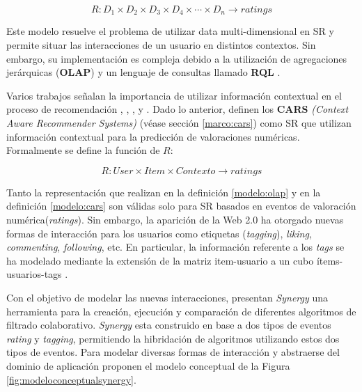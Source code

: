 \begin{equation}
\label{modelo:olap}
	R: D_1 \times D_2 \times D_3 \times D_4 \times \cdots \times D_n \rightarrow ratings
\end{equation}

Este modelo resuelve el problema de utilizar data multi-dimensional en SR y permite situar las interacciones de un usuario en distintos contextos. Sin embargo, su implementación es compleja debido a la utilización de agregaciones jerárquicas (\textbf{OLAP}) y un lenguaje de consultas llamado \textbf{RQL} \citep{Palomino:2012}.

Varios trabajos señalan la importancia de utilizar información contextual en el proceso de recomendación \citep{Adomavicius:2005:2}, \citep{Adomavicius:2001}, \citep{Adomavicius:2011}, \citep{Palomino:2012} y \citep{Zhang:2010}. Dado lo anterior, \cite{Adomavicius:2011} definen  los \textbf{CARS} \textit{(Context Aware Recommender Systems)} (véase sección \ref{marco:cars}) como SR que utilizan información contextual para la predicción de valoraciones numéricas. Formalmente se define la función de $R$:

\begin{equation}
\label{modelo:cars}
	R: User \times Item \times Contexto  \rightarrow ratings
\end{equation}

Tanto la representación que realizan \cite{Adomavicius:2001} en la definición \eqref{modelo:olap} y  \cite{Adomavicius:2011} en la definición \eqref{modelo:cars} son válidas solo para SR basados en eventos de valoración numérica(\textit{ratings}). Sin embargo, la aparición de la Web 2.0 ha otorgado nuevas formas de interacción para los usuarios como etiquetas (\textit{tagging}), \textit{liking}, \textit{commenting}, \textit{following}, etc. En particular, la información referente a los \textit{tags} se ha modelado mediante la extensión de la matriz item-usuario a un cubo ítems-usuarios-tags \citep{Song:2011}.

Con el objetivo de modelar las nuevas interacciones, \cite{Babar:2010} presentan \textit{Synergy} una herramienta para la creación, ejecución y comparación de diferentes algoritmos de filtrado colaborativo. \textit{Synergy} esta construido en base a dos tipos de eventos \textit{rating} y \textit{tagging}, permitiendo la hibridación de algoritmos utilizando estos dos tipos de eventos. Para modelar diversas formas de interacción y abstraerse del dominio de aplicación proponen el modelo conceptual de la Figura \ref{fig:modeloconceptualsynergy}. 

